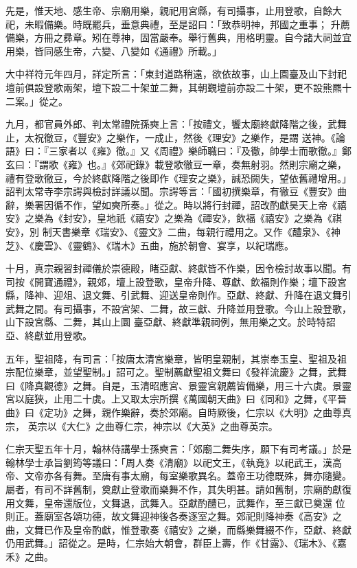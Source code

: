\begin{pinyinscope}
 先是，惟天地、感生帝、宗廟用樂，親祀用宮縣，有司攝事，止用登歌，自餘大祀，未暇備樂。時既罷兵，垂意典禮，至是詔曰：「致恭明神，邦國之重事；
 升薦備樂，方冊之彞章。矧在尊神，固當嚴奉。舉行舊典，用格明靈。自今諸大祠並宜用樂，皆同感生帝，六變、八變如《通禮》所載。」



 大中祥符元年四月，詳定所言：「東封道路稍遠，欲依故事，山上園臺及山下封祀壇前俱設登歌兩架，壇下設二十架並二舞，其朝覲壇前亦設二十架，更不設熊羆十二案。」從之。



 九月，都官員外郎、判太常禮院孫奭上言：「按禮文，饗太廟終獻降階之後，武舞止，太祝徹豆，《豐安》之樂作，一成止，然後《理安》之樂作，是謂
 送神。《論語》曰：『三家者以《雍》徹。』又《周禮》樂師職曰：『及徹，帥學士而歌徹。』鄭玄曰：『謂歌《雍》也。』《郊祀錄》載登歌徹豆一章，奏無射羽。然則宗廟之樂，禮有登歌徹豆，今於終獻降階之後即作《理安之樂》，誠恐闕失，望依舊禮增用。」詔判太常寺李宗諤與檢討詳議以聞。宗諤等言：「國初撰樂章，有徹豆《豐安》曲辭，樂署因循不作，望如奭所奏。」從之。時以將行封禪，詔改酌獻昊天上帝《禧安》之樂為《封安》，皇地祇《禧安》之樂為《禪安》，飲福《禧安》之樂為《祺安》，別
 制天書樂章《瑞安》、《靈文》二曲，每親行禮用之。又作《醴泉》、《神芝》、《慶雲》、《靈鶴》、《瑞木》五曲，施於朝會、宴享，以紀瑞應。



 十月，真宗親習封禪儀於崇德殿，睹亞獻、終獻皆不作樂，因令檢討故事以聞。有司按《開寶通禮》，親郊，壇上設登歌，皇帝升降、尊獻、飲福則作樂；壇下設宮縣，降神、迎俎、退文舞、引武舞、迎送皇帝則作。亞獻、終獻、升降在退文舞引武舞之間。有司攝事，不設宮架、二舞，故三獻、升降並用登歌。今山上設登歌，山下設宮縣、二舞，其山上圜
 臺亞獻、終獻準親祠例，無用樂之文。於時特詔亞、終獻並用登歌。



 五年，聖祖降，有司言：「按唐太清宮樂章，皆明皇親制，其崇奉玉皇、聖祖及祖宗配位樂章，並望聖制。」詔可之。聖制薦獻聖祖文舞曰《發祥流慶》之舞，武舞曰《降真觀德》之舞。自是，玉清昭應宮、景靈宮親薦皆備樂，用三十六虡。景靈宮以庭狹，止用二十虡。上又取太宗所撰《萬國朝天曲》曰《同和》之舞，《平晉曲》曰《定功》之舞，親作樂辭，奏於郊廟。自時厥後，仁宗以《大明》之曲尊真宗，
 英宗以《大仁》之曲尊仁宗，神宗以《大英》之曲尊英宗。



 仁宗天聖五年十月，翰林侍講學士孫奭言：「郊廟二舞失序，願下有司考議。」於是翰林學士承旨劉筠等議曰：「周人奏《清廟》以祀文王，《執竟》以祀武王，漢高帝、文帝亦各有舞。至唐有事太廟，每室樂歌異名。蓋帝王功德既殊，舞亦隨變。屬者，有司不詳舊制，奠獻止登歌而樂舞不作，其失明甚。請如舊制，宗廟酌獻復用文舞，皇帝還版位，文舞退，武舞入。亞獻酌醴已，武舞作，至三獻已奠還
 位則正。蓋廟室各頌功德，故文舞迎神後各奏逐室之舞。郊祀則降神奏《高安》之曲，文舞已作及皇帝酌獻，惟登歌奏《禧安》之樂，而縣樂舞綴不作，亞獻、終獻仍用武舞。」詔從之。是時，仁宗始大朝會，群臣上壽，作《甘露》、《瑞木》、《嘉禾》之曲。




\end{pinyinscope}
